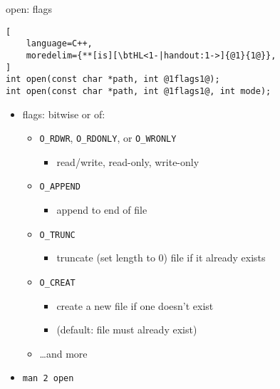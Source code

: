 \begin{frame}[fragile,label=flagsExplain]{open: flags}
\begin{lstlisting}[
    language=C++,
    moredelim={**[is][\btHL<1-|handout:1->]{@1}{1@}},
]
int open(const char *path, int @1flags1@);
int open(const char *path, int @1flags1@, int mode);
\end{lstlisting}
\begin{itemize}
\item flags: bitwise or of:
    \begin{itemize}
    \item \texttt{O\_RDWR}, \texttt{O\_RDONLY}, or \texttt{O\_WRONLY}
        \begin{itemize}
        \item read/write, read-only, write-only
        \end{itemize}
    \item \texttt{O\_APPEND}
        \begin{itemize}
        \item append to end of file
        \end{itemize}
    \item \texttt{O\_TRUNC}
        \begin{itemize}
        \item truncate (set length to 0) file if it already exists
        \end{itemize}
    \item \texttt{O\_CREAT}
        \begin{itemize}
        \item create a new file if one doesn't exist
        \item (default: file must already exist)
        \end{itemize}
    \item \ldots and more %
    \end{itemize}
\item \texttt{man 2 open}
\end{itemize}
\end{frame}

